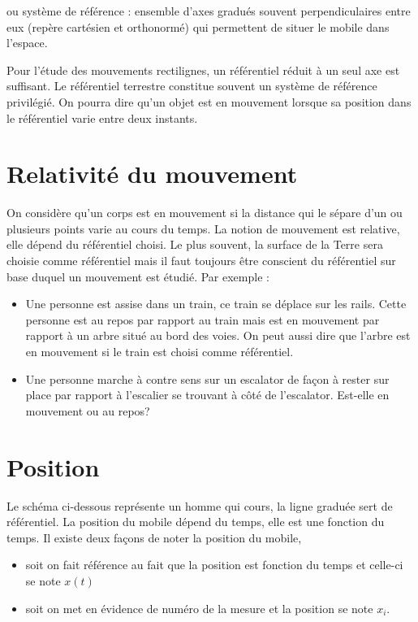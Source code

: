 \begin{encadre}
     ou système de référence : ensemble d'axes gradués souvent perpendiculaires entre eux (repère cartésien et orthonormé) qui permettent de situer le mobile dans l'espace.
\end{encadre}

Pour l'étude des mouvements rectilignes, un référentiel réduit à un seul axe est suffisant. Le référentiel terrestre constitue souvent un système de référence privilégié.
On pourra dire qu'un objet est en mouvement lorsque sa position dans le référentiel varie entre deux instants.

\newpage

\section{Relativité du mouvement}
On considère qu'un corps est en mouvement si la distance qui le sépare d'un ou plusieurs points varie au cours du temps. La notion de mouvement est relative, elle dépend du référentiel choisi. Le plus souvent, la surface de la Terre sera choisie comme référentiel mais il faut toujours être conscient du référentiel sur base duquel un mouvement est étudié.
Par exemple :
\begin{itemize}[label= \textbullet]
    \item Une personne est assise dans un train, ce train se déplace sur les rails. Cette personne est au repos par rapport au train mais est en mouvement par rapport à un arbre situé au bord des voies. On peut aussi dire que l'arbre est en mouvement si le train est choisi comme référentiel.
    \item Une personne marche à contre sens sur un escalator de façon à rester sur place par rapport à l'escalier se trouvant à côté de l'escalator. Est-elle en mouvement ou au repos?
\end{itemize}

\newpage

\section{Position}
Le schéma ci-dessous représente un homme qui cours, la ligne graduée sert de référentiel. La position du mobile dépend du temps, elle est une fonction du temps. Il existe deux façons de noter la position du mobile,
\begin{itemize}[label= \textbullet]
    \item soit on fait référence au fait que la position est fonction du temps et celle-ci se note \(x(t)\)
    \item soit on met en évidence de numéro de la mesure et la position se note \(x_i\).
\end{itemize}

